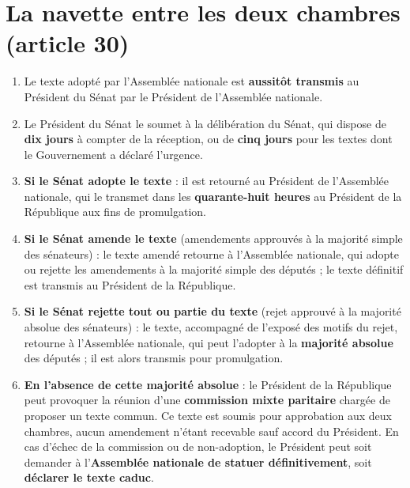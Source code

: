 \documentclass[11pt,a4paper,oneside]{report}
\begin{document}
\section{La navette entre les deux chambres (article 30)}
\begin{enumerate}
  \item Le texte adopté par l'Assemblée nationale est \textbf{aussitôt transmis} au Président du Sénat par le Président de l'Assemblée nationale.
  \item Le Président du Sénat le soumet à la délibération du Sénat, qui dispose de \textbf{dix jours} à compter de la réception, ou de \textbf{cinq jours} pour les textes dont le Gouvernement a déclaré l'urgence.
  \item \textbf{Si le Sénat adopte le texte} : il est retourné au Président de l'Assemblée nationale, qui le transmet dans les \textbf{quarante-huit heures} au Président de la République aux fins de promulgation.
  \item \textbf{Si le Sénat amende le texte} (amendements approuvés à la majorité simple des sénateurs) : le texte amendé retourne à l'Assemblée nationale, qui adopte ou rejette les amendements à la majorité simple des députés ; le texte définitif est transmis au Président de la République.
  \item \textbf{Si le Sénat rejette tout ou partie du texte} (rejet approuvé à la majorité absolue des sénateurs) : le texte, accompagné de l'exposé des motifs du rejet, retourne à l'Assemblée nationale, qui peut l'adopter à la \textbf{majorité absolue} des députés ; il est alors transmis pour promulgation.
  \item \textbf{En l'absence de cette majorité absolue} : le Président de la République peut provoquer la réunion d'une \textbf{commission mixte paritaire} chargée de proposer un texte commun. Ce texte est soumis pour approbation aux deux chambres, aucun amendement n'étant recevable sauf accord du Président. En cas d'échec de la commission ou de non-adoption, le Président peut soit demander à l'\textbf{Assemblée nationale de statuer définitivement}, soit \textbf{déclarer le texte caduc}.
\end{enumerate}
\end{document}
